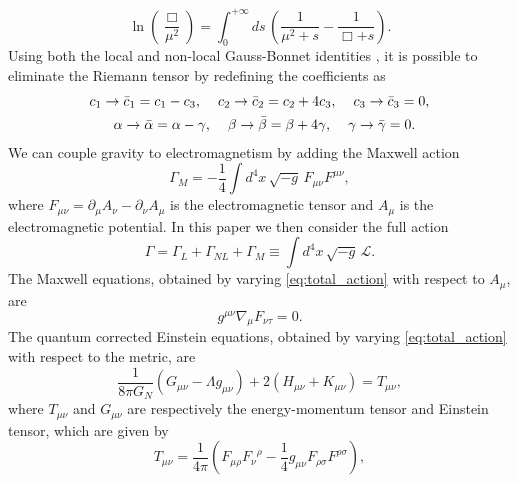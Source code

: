 \documentclass[10pt,a4paper]{article}
\begin{document}
\begin{equation}
    \ln\left(\frac{\Box}{\mu^2}\right)=\int_0^{+\infty}ds\, \left(\frac{1}{\mu^2+s}-\frac{1}{\Box+s}\right).
\end{equation}
Using both the local and non-local Gauss-Bonnet identities \cite{Calmet:2018elv}, it is possible to eliminate the Riemann tensor by redefining the coefficients as
\begin{equation}
\begin{split}
   c_1 &\to\bar{c}_1=c_1-c_3, \hspace{4mm}c_2\to\bar{c}_2=c_2+4c_3, \hspace{4mm} c_3\to  \bar{c}_3=0,\\
    &\hspace{3mm}\alpha\to\bar{\alpha}=\alpha-\gamma, \hspace{4mm} \beta\to\bar{\beta}=\beta+4\gamma, \hspace{4mm} \gamma\to\bar{\gamma}=0.
\end{split}
\end{equation}
We can couple gravity to electromagnetism by adding the Maxwell action
\begin{equation}
    \Gamma_{M}=-\frac{1}{4}\int d^4x\,\sqrt{-g}\,F_{\mu\nu}F^{\mu\nu},
\end{equation}
where $F_{\mu\nu}=\partial_{\mu}A_{\nu}-\partial_{\nu}A_{\mu}$ is the electromagnetic tensor and $A_{\mu}$ is the electromagnetic potential.
In this paper we then consider the full action
\begin{equation}\label{eq:total_action}
    \Gamma=\Gamma_{L}+\Gamma_{NL}+\Gamma_{M}\equiv\int d^4x\,\sqrt{-g}\,\mathcal{L}.
\end{equation}
The Maxwell equations, obtained by varying \eqref{eq:total_action} with respect to $A_{\mu}$, are
\begin{equation}\label{eq:maxwell_equations}
    g^{\mu\nu}\nabla_{\mu}F_{\nu\tau}=0.
\end{equation}
The quantum corrected Einstein equations, obtained by varying \eqref{eq:total_action} with respect to the metric, are
\begin{equation}\label{eq:einstein_equations}
    \frac{1}{8\pi G_N}\left(G_{\mu\nu}-\Lambda g_{\mu\nu}\right)+2\left(H_{\mu\nu}+K_{\mu\nu}\right)=T_{\mu\nu},
\end{equation}
where $T_{\mu\nu}$ and $G_{\mu\nu}$ are respectively the energy-momentum tensor and Einstein tensor, which are given by
\begin{equation}
    T_{\mu\nu}=\frac{1}{4\pi}\left(F_{\mu\rho}{F_{\nu}}^{\rho}-\frac{1}{4}g_{\mu\nu}F_{\rho\sigma}F^{\rho\sigma}\right),
\end{equation}
\end{document}
